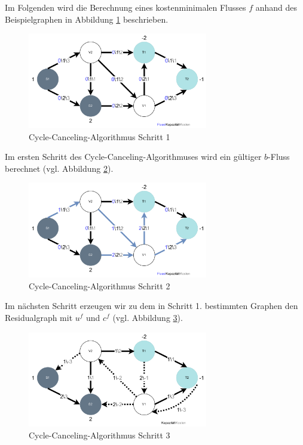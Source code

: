 Im Folgenden wird die Berechnung eines kostenminimalen Flusses $f$ anhand des Beispielgraphen in Abbildung \ref{fig:cc_step1} beschrieben.
\begin{figure}[htb]
\centering
\includegraphics[width=0.7\textwidth]{img/leo/graph1-Page-1.drawio.pdf}
\caption{Cycle-Canceling-Algorithmus Schritt 1}
\label{fig:cc_step1}
\end{figure}

Im ersten Schritt des Cycle-Canceling-Algorithmuses wird ein gültiger $b$-Fluss berechnet (vgl. Abbildung \ref{fig:cc_step2}).
\begin{figure}[htb]
\centering
\includegraphics[width=0.7\textwidth]{img/leo/graph1-Page-2.drawio.pdf}
\caption{Cycle-Canceling-Algorithmus Schritt 2}
\label{fig:cc_step2}
\end{figure}

Im nächsten Schritt erzeugen wir zu dem in Schritt 1. bestimmten Graphen den Residualgraph mit $u^f$ und $c^f$ (vgl. Abbildung \ref{fig:cc_step3}).
\begin{figure}[htb]
\centering
\includegraphics[width=0.7\textwidth]{img/leo/graph1-Page-3.drawio.pdf}
\caption{Cycle-Canceling-Algorithmus Schritt 3}
\label{fig:cc_step3}
\end{figure}

